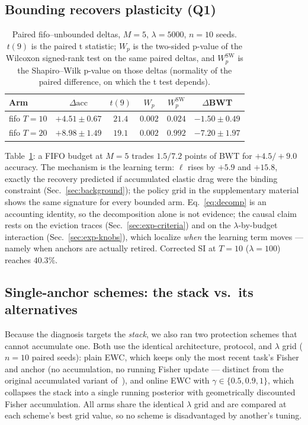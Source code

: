 \documentclass[review,11pt,number]{elsarticle}
\newcommand{\acc}{\mathrm{acc}}
\begin{document}
\subsection{Bounding recovers plasticity (Q1)}
\label{sec:exp-main}

\begin{table}[t]
\centering\small
\caption{Paired fifo--unbounded deltas, $M{=}5$, $\lambda{=}5000$,
$n{=}10$ seeds. $t(9)$ is the paired t statistic; $W_p$ is the
two-sided p-value of the Wilcoxon signed-rank test on the same paired
deltas, and $W_p^{\mathrm{SW}}$ is the Shapiro--Wilk p-value on those
deltas (normality of the paired difference, on which the t test
depends).}
\label{tab:paired}
\begin{tabular}{lccccc}
\toprule
Arm & $\Delta\acc$ & $t(9)$ & $W_p$ & $W_p^{\mathrm{SW}}$ & $\Delta$BWT \\
\midrule
fifo $T{=}10$ & $+4.51\pm0.67$ & $21.4$ & $0.002$ & $0.024$ & $-1.50\pm0.49$ \\
fifo $T{=}20$ & $+8.98\pm1.49$ & $19.1$ & $0.002$ & $0.992$ & $-7.20\pm1.97$ \\
\bottomrule
\end{tabular}
\end{table}



Table~\ref{tab:paired}: a FIFO budget at $M{=}5$ trades $1.5/7.2$ points
of BWT for $+4.5/+9.0$ accuracy. The mechanism is the learning term:
$\ell$ rises by $+5.9$ and $+15.8$, exactly the recovery predicted if
accumulated elastic drag were the binding constraint
(Sec.~\ref{sec:background}); the policy grid in the supplementary
material shows the same signature for every bounded arm.
Eq.~\ref{eq:decomp} is an accounting identity, so the decomposition
alone is not evidence; the causal claim rests on the eviction traces
(Sec.~\ref{sec:exp-criteria}) and on the $\lambda$-by-budget
interaction (Sec.~\ref{sec:exp-knobs}), which localize \emph{when}
the learning term moves --- namely when anchors are actually retired.
Corrected SI at $T{=}10$ ($\lambda{=}100$) reaches $40.3\%$.

\subsection{Single-anchor schemes: the stack vs.\ its alternatives}
\label{sec:exp-references}

Because the diagnosis targets the \emph{stack}, we also ran two
protection schemes that cannot accumulate one. Both use the identical
architecture, protocol, and $\lambda$ grid ($n{=}10$ paired seeds):
plain EWC, which keeps only the most recent task's Fisher and anchor
(no accumulation, no running Fisher update --- distinct from the
original accumulated variant of~\cite{kirkpatrick2017}), and online
EWC \cite{chaudhry2018} with $\gamma \in \{0.5, 0.9, 1\}$, which
collapses the stack into a single running posterior with geometrically
discounted Fisher accumulation. All arms share the identical
$\lambda$ grid and are compared at each scheme's best grid value, so
no scheme is disadvantaged by another's tuning.
\end{document}
